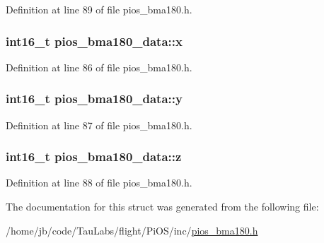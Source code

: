 \-Definition at line 89 of file pios\-\_\-bma180.\-h.

\hypertarget{structpios__bma180__data_ab20204f27147fd128d19681833d58a46}{
\subsubsection[{x}]{\setlength{\rightskip}{0pt plus 5cm}int16\-\_\-t {\bf pios\-\_\-bma180\-\_\-data\-::x}}}\label{structpios__bma180__data_ab20204f27147fd128d19681833d58a46}


\-Definition at line 86 of file pios\-\_\-bma180.\-h.

\hypertarget{structpios__bma180__data_ac27d83e52f78250976c48fd43d6c7512}{
\subsubsection[{y}]{\setlength{\rightskip}{0pt plus 5cm}int16\-\_\-t {\bf pios\-\_\-bma180\-\_\-data\-::y}}}\label{structpios__bma180__data_ac27d83e52f78250976c48fd43d6c7512}


\-Definition at line 87 of file pios\-\_\-bma180.\-h.

\hypertarget{structpios__bma180__data_ac424fcb7679ca4c9956a8c80ad486cc6}{
\subsubsection[{z}]{\setlength{\rightskip}{0pt plus 5cm}int16\-\_\-t {\bf pios\-\_\-bma180\-\_\-data\-::z}}}\label{structpios__bma180__data_ac424fcb7679ca4c9956a8c80ad486cc6}


\-Definition at line 88 of file pios\-\_\-bma180.\-h.



\-The documentation for this struct was generated from the following file\-:\begin{DoxyCompactItemize}
\item 
/home/jb/code/\-Tau\-Labs/flight/\-Pi\-O\-S/inc/\hyperlink{pios__bma180_8h}{pios\-\_\-bma180.\-h}\end{DoxyCompactItemize}
